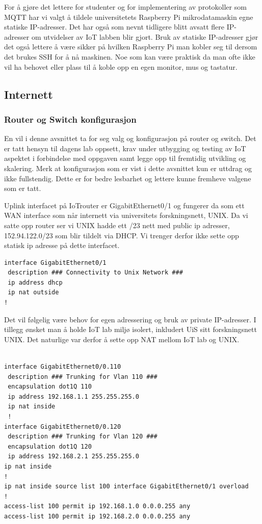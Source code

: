 \documentclass{article}
\begin{document}
For å gjøre det lettere for studenter og for implementering av protokoller som MQTT har vi valgt å tildele universitetets Raspberry Pi mikrodatamaskin egne statiske IP-adresser. Det har også som nevnt tidligere blitt avsatt flere IP-adresser om utvidelser av IoT labben blir gjort. Bruk av statiske IP-adresser gjør det også lettere å være sikker på hvilken Raspberry Pi man kobler seg til dersom det brukes SSH for å nå maskinen. Noe som kan være praktisk da man ofte ikke vil ha behovet eller plass til å koble opp en egen monitor, mus og tastatur. 



\subsection{Internett}

\subsubsection{Router og Switch konfigurasjon}
En vil i denne avsnittet ta for seg valg og konfigurasjon på router og switch. Det er tatt hensyn til dagens lab oppsett, krav under utbygging og testing av IoT aspektet i forbindelse med oppgaven samt legge opp til fremtidig utvikling og skalering. Merk at konfigurasjon som er vist i dette avsnittet kun er uttdrag og ikke fullstendig. Dette er for bedre lesbarhet og lettere kunne fremheve valgene som er tatt. 


Uplink interfacet på IoTrouter er GigabitEthernet0/1 og fungerer da som ett WAN interface som når internett via universitets forskningsnett, UNIX. Da vi satte opp router ser vi UNIX hadde ett /23 nett med public ip adresser, 152.94.122.0/23 som blir tildelt via DHCP. Vi trenger derfor ikke sette opp statisk ip adresse på dette interfacet. 


\begin{verbatim}
interface GigabitEthernet0/1
 description ### Connectivity to Unix Network ###
 ip address dhcp
 ip nat outside
!
\end{verbatim}

Det vil følgelig være behov for egen adressering og bruk av private IP-adresser. I tillegg ønsket man å holde IoT lab miljø isolert, inkludert UiS sitt forskningsnett UNIX. Det naturlige var derfor å sette opp NAT mellom IoT lab og UNIX.


\lstset{breaklines=true}
\begin{verbatim}

interface GigabitEthernet0/0.110
 description ### Trunking for Vlan 110 ###
 encapsulation dot1Q 110
 ip address 192.168.1.1 255.255.255.0
 ip nat inside
 !
interface GigabitEthernet0/0.120
 description ### Trunking for Vlan 120 ###
 encapsulation dot1Q 120
 ip address 192.168.2.1 255.255.255.0
ip nat inside
!
ip nat inside source list 100 interface GigabitEthernet0/1 overload
!
access-list 100 permit ip 192.168.1.0 0.0.0.255 any
access-list 100 permit ip 192.168.2.0 0.0.0.255 any

\end{verbatim}
\end{document}
